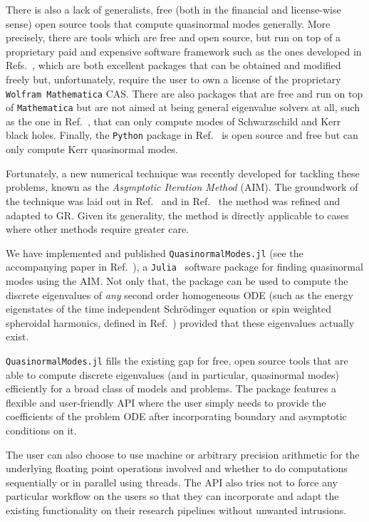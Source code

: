 There is also a lack of generalists, free (both in the financial and license-wise sense) open source tools that compute quasinormal modes generally. More precisely, there are tools which are free and open source, but run on top of a proprietary paid and expensive software framework such as the ones developed in Refs.~\cite{qnmspectral,spectralbp}, which are both excellent packages that can be obtained and modified freely but, unfortunately, require the user to own a license of the proprietary \texttt{Wolfram Mathematica} \ac{CAS}. There are also packages that are free and run on top of \texttt{Mathematica} but are not aimed at being general eigenvalue solvers at all, such as the one in Ref.~\cite{bhpt_quasinormalmodes}, that can only compute modes of Schwarzschild and Kerr black holes. Finally, the \texttt{Python} package in Ref.~\cite{bhpt_qnm} is open source and free but can only compute Kerr quasinormal modes.

Fortunately, a new numerical technique was recently developed for tackling these problems, known as the \emph{Asymptotic Iteration Method} (\ac{AIM}). The groundwork of the technique was laid out in Ref.~\cite{aim_original} and in Ref.~\cite{aim_improved} the method was refined and adapted to \ac{GR}. Given its generality, the method is directly applicable to cases where other methods require greater care.

We have implemented and published \texttt{QuasinormalModes.jl} (see the accompanying paper in Ref.~\cite{Sanches2022}), a \texttt{Julia}~\cite{Bezanson2017} software package for finding quasinormal modes using the \ac{AIM}. Not only that, the package can be used to compute the discrete eigenvalues of \emph{any} second order homogeneous \ac{ODE} (such as the energy eigenstates of the time independent Schrödinger equation or spin weighted spheroidal harmonics, defined in Ref.~\cite{PhysRevD.73.024013}) provided that these eigenvalues actually exist.

\texttt{QuasinormalModes.jl} fills the existing gap for free, open source tools that are able to compute discrete eigenvalues (and in particular, quasinormal modes) efficiently for a broad class of models and problems. The package features a flexible and user-friendly \ac{API} where the user simply needs to provide the coefficients of the problem \ac{ODE} after incorporating boundary and asymptotic conditions on it.

The user can also choose to use machine or arbitrary precision arithmetic for the underlying floating point operations involved and whether to do computations sequentially or in parallel using threads. The \ac{API} also tries not to force any particular workflow on the users so that they can incorporate and adapt the existing functionality on their research pipelines without unwanted intrusions.

